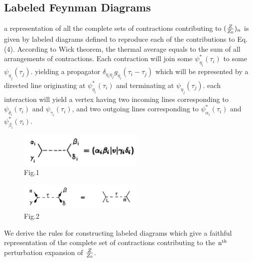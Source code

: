 \documentclass[12pt]{article}
\begin{document}
\subsection*{Labeled Feynman Diagrams}
a representation of all the complete sets of contractions contributing to 
$({\tiny\frac{Z}{Z_0}})_n$ is given by labeled diagrams defined to reproduce each 
of the contributions to Eq.(4). According to Wick theorem, the thermal average 
equals to the sum of all arrangements of contractions. Each contraction will join 
some $\psi^*_{\eta_i}(\tau_i)$ to some $\psi_{\eta_j}(\tau_j)$. yielding a propagator 
$\delta_{\eta_i\eta_j}g_{\eta_i}(\tau_i-\tau_j)$ which will be represented by a 
directed line originating at $\psi^*_{\eta_i}(\tau_i)$ and terminating at 
$\psi_{\eta_j}(\tau_j)$. each interaction will yield a vertex having two incoming 
lines corresponding to $\psi_{\delta_i}(\tau_i)$ and $\psi_{\gamma_i}(\tau_i)$, 
and two outgoing lines corresponding to $\psi^*_{\alpha_i}(\tau_i)$ and 
$\psi^*_{\beta_i}(\tau_i)$.
\begin{figure}[H]
    \centering
    \includegraphics[width=6cm]{p1.png}
    \caption*{Fig.1}\label{}
\end{figure}
\begin{figure}[H]
    \centering
    \includegraphics[width=6cm]{p2.png}
    \caption*{Fig.2}\label{}
\end{figure}
We derive the rules for constructing labeled diagrams which give a faithful 
representation of the complete set of contractions contributing to the $\rm n^{th}$ 
perturbation expansion of $\tiny \frac{Z}{Z_0}$.
\end{document}
